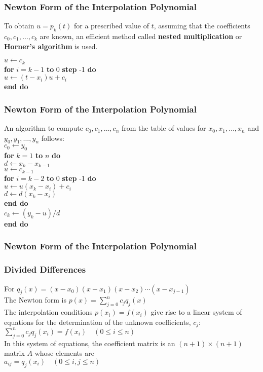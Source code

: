 \documentclass[notheorems,mathserif,table,compress]{beamer}  %
\begin{document}
\begin{frame}
  \frametitle{Newton Form of the Interpolation Polynomial}
  To obtain $u=p_k(t)$ for a prescribed value of $t$, assuming that the coefficients $c_0,c_1,\ldots,c_k$ are known, an efficient method called \textbf{nested multiplication} or \textbf{Horner's algorithm} is used.
  
  $u \gets c_k$\\
  \textbf{for} $i=k-1$ \textbf{to} 0 \textbf{step} -1 \textbf{do}\\
  \quad $u \gets (t-x_i)u+c_i$\\
  \textbf{end do}
\end{frame}


\begin{frame}
  \frametitle{Newton Form of the Interpolation Polynomial}
  An algorithm to compute $c_0,c_1,\ldots,c_n$ from the table of values for $x_0,x_1,\ldots,x_n$ and $y_0,y_1,\ldots,y_n$ follows:\\
  $c_0 \gets y_0$\\
  \textbf{for} $k=1$ \textbf{to} $n$ \textbf{do}\\
  \quad $d \gets x_k-x_{k-1}$\\
  \quad $u \gets c_{k-1}$\\
  \quad \textbf{for} $i=k-2$ \textbf{to} 0 \textbf{step} -1 \textbf{do}\\
  \quad \quad $u \gets u(x_k-x_i)+c_i$\\
  \quad \quad $d \gets d(x_k-x_i)$\\
  \quad \textbf{end do}\\
  \quad $c_k \gets (y_k-u)/d$\\
  \textbf{end do}
\end{frame}


\begin{frame}
  \frametitle{Newton Form of the Interpolation Polynomial}
  
\end{frame}


\begin{frame}
  \frametitle{Divided Differences}
  For $q_j(x)=(x-x_0)(x-x_1)(x-x_2)\cdots(x-x_{j-1})$\\
  The Newton form is $p(x)=\sum_{j=0}^n c_jq_j(x)$\\
  The interpolation conditions $p(x_i)=f(x_i)$ give rise to a linear system of equations for the determination of the unknown coefficients, $c_j$:\\
  \quad \quad $\sum_{j=0}^n c_jq_j(x_i)=f(x_i) \quad (0\le i\le n)$\\
  In this system of equations, the coefficient matrix is an $(n+1)\times(n+1)$ matrix $A$ whose elements are\\
  \quad \quad $a_{ij}=q_j(x_i) \quad (0\le i, j\le n)$\\
  
\end{frame}
\end{document}
